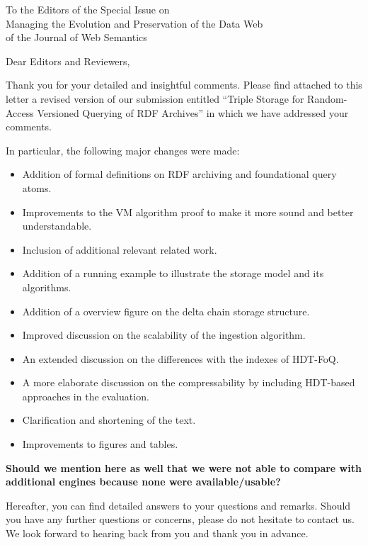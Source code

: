 \documentclass{letter}
\begin{document}
\begin{letter}{To the Editors of the Special Issue on\\Managing the Evolution and Preservation of the Data Web\\of the Journal of Web Semantics}
\opening{Dear Editors and Reviewers,}

\null\vspace{\baselineskip}

{\parfillskip 0pt
Thank you for your detailed and insightful comments.
Please find attached to this letter a revised version of our submission entitled
\enquote{Triple Storage for Random-Access Versioned Querying of RDF Archives}
in which we have addressed your comments.
}

In particular, the following major changes were made:
\begin{itemize}
  \item Addition of formal definitions on RDF archiving and foundational query atoms.
  \item Improvements to the VM algorithm proof to make it more sound and better understandable.
  \item Inclusion of additional relevant related work.
  \item Addition of a running example to illustrate the storage model and its algorithms.
  \item Addition of a overview figure on the delta chain storage structure.
  \item Improved discussion on the scalability of the ingestion algorithm.
  \item An extended discussion on the differences with the indexes of HDT-FoQ.
  \item A more elaborate discussion on the compressability by including HDT-based approaches in the evaluation.
  \item Clarification and shortening of the text.
  \item Improvements to figures and tables.
\end{itemize}

\textbf{Should we mention here as well that we were not able to compare with additional engines because none were available/usable?}

{\parfillskip 0pt
Hereafter, you can find detailed answers to your questions and remarks.
Should you have any further questions or concerns, please do not hesitate to contact us.
We look forward to hearing back from you and thank you in advance.
}

\null\vspace{\baselineskip}


\end{letter}
\end{document}
